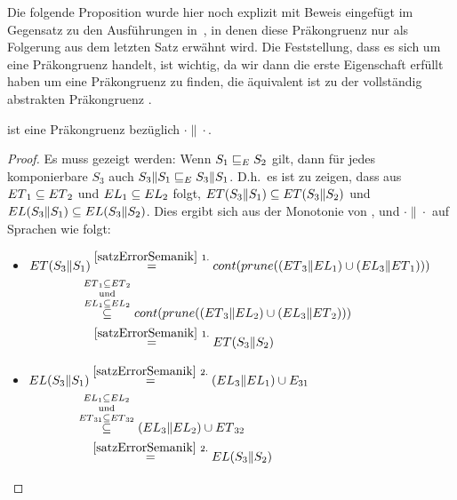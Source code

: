 Die folgende Proposition wurde hier noch explizit mit Beweis eingefügt im
Gegensatz zu den Ausführungen in~\cite{Vogler2014EIO}, in denen diese
Präkongruenz nur als Folgerung aus dem letzten Satz erwähnt wird. Die
Feststellung, dass es sich um eine Präkongruenz handelt, ist wichtig, da wir
dann die erste Eigenschaft erfüllt haben um eine Präkongruenz zu finden, die
äquivalent ist zu der vollständig abstrakten Präkongruenz \ECRel{}.

\begin{prop}[Präkongruenz]
  \label{propPraekongruenz}
  \ERel{} ist eine Präkongruenz bezüglich $\cdot\|\cdot$.
\end{prop}

\begin{proof}
  Es muss gezeigt werden: Wenn $S_1\sqsubseteq _E S_2$ gilt, dann für jedes
  komponierbare $S_3$ auch $S_3\|S_1\sqsubseteq _E S_3\|S_1$. D.h.\ es ist zu zeigen,
  dass aus $ET{}_1\subseteq ET{}_2$ und $EL{}_1\subseteq EL{}_2$ folgt,
  $ET{}(S_3\|S_1)\subseteq ET{}(S_3\|S_2)$ und $EL{}(S_3\|S_1)\subseteq
  EL{}(S_3\|S_2)$. Dies ergibt sich aus der Monotonie von \cont{}, \prune{}
  und $\cdot \|\cdot$ auf Sprachen wie folgt:\\
  \begin{itemize}
    \item $\begin{aligned}[t]
        \ET{}(S_3\|S_1) &\overset{\ref{satzErrorSemanik}~1.}{=}
      \cont{}(\prune{}((\ET{}_3\|\EL{}_1)\cup (\EL{}_3\|\ET{}_1)))\\
      &\hspace{-0.3cm}\overset{\ET{}_1\subseteq
    \ET{}_2}{\overset{\mathrm{und}}{\overset{\EL{}_1\subseteq \EL{}_2}{\subseteq}}}
    \cont{}(\prune{}((\ET{}_3\|\EL{}_2)\cup (\EL{}_3\|\ET{}_2)))\\
      &\overset{\ref{satzErrorSemanik}~1.}{=} \ET{}(S_3\|S_2)
    \end{aligned}$
    \item $\begin{aligned}[t]
        \EL{}(S_3\|S_1) &\overset{\ref{satzErrorSemanik}~2.}{=} (\EL{}_3\|\EL{}_1)\cup
        E_{31}\\
        &\hspace{-0.4cm}\overset{\EL{}_1\subseteq
      \EL{}_2}{\overset{\mathrm{und}}{\overset{\ET{}_{31}\subseteq
      \ET{}_{32}}{\subseteq}}} (\EL{}_3\|\EL{}_2)\cup \ET{}_{32}\\
      &\overset{\ref{satzErrorSemanik}~2.}{=} \EL{}(S_3\|S_2)
    \end{aligned}$
  \end{itemize}
\end{proof}


